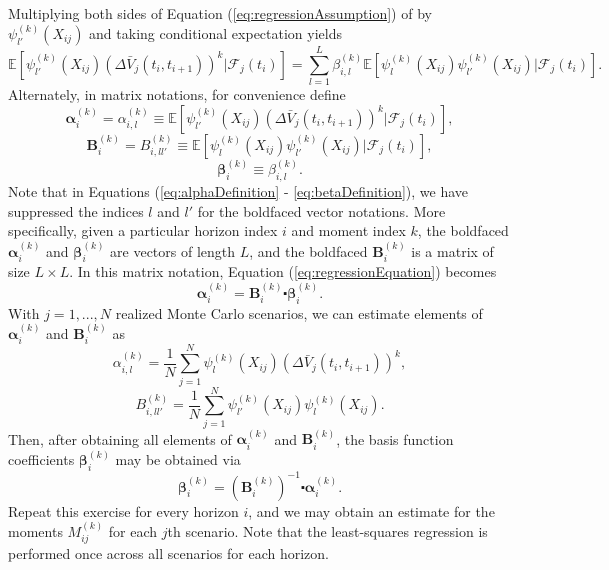 \documentclass[preprint,12pt]{elsarticle}
\begin{document}
Multiplying both sides of Equation (\ref{eq:regressionAssumption}) of by $\psi_{l'}^{(k)}(X_{ij})$ and taking conditional expectation yields
\begin{equation}\label{eq:regressionEquation}
\mathbb{E}\left[\psi_{l'}^{(k)}(X_{ij})\left(\Delta\bar{V}_{j}(t_{i},t_{i+1})\right)^{k}|\mathcal{F}_{j}(t_{i})\right]=\sum_{l=1}^{L}\beta_{i,l}^{(k)}\mathbb{E}\left[\psi_{l}^{(k)}(X_{ij})\psi_{l'}^{(k)}(X_{ij})|\mathcal{F}_{j}(t_{i})\right].
\end{equation}
 Alternately, in matrix notations, for convenience define
\begin{equation}\label{eq:alphaDefinition}
\boldsymbol{\alpha}_{i}^{(k)}=\alpha_{i,l}^{(k)}\equiv\mathbb{E}\left[\psi_{l'}^{(k)}(X_{ij})\left(\Delta\bar{V}_{j}(t_{i},t_{i+1})\right)^{k}|\mathcal{F}_{j}(t_{i})\right],
\end{equation}
\begin{equation}\label{eq:BDefinition}
\boldsymbol{B}_{i}^{(k)}=B_{i,ll'}^{(k)}\equiv\mathbb{E}\left[\psi_{l}^{(k)}(X_{ij})\psi_{l'}^{(k)}(X_{ij})|\mathcal{F}_{j}(t_{i})\right],
\end{equation} 
\begin{equation}\label{eq:betaDefinition}
\boldsymbol{\beta}_{i}^{(k)}\equiv\beta_{i,l}^{(k)}.
\end{equation} 
Note that in Equations (\ref{eq:alphaDefinition} - \ref{eq:betaDefinition}), we have suppressed the indices $l$ and $l'$ for the boldfaced vector notations. More specifically, given a particular horizon index $i$ and moment index $k$, the boldfaced $\boldsymbol{\alpha}_{i}^{(k)}$ and $\boldsymbol{\beta}_{i}^{(k)}$ are vectors of length $L$, and the boldfaced $\boldsymbol{B}_{i}^{(k)}$ is a matrix of size $L\times L$. In this matrix notation, Equation (\ref{eq:regressionEquation}) becomes
\begin{equation}
\boldsymbol{\alpha}_{i}^{(k)}=\boldsymbol{B}_{i}^{(k)}\centerdot\boldsymbol{\beta}_{i}^{(k)}.
\end{equation}
With $j=1,...,N$ realized Monte Carlo scenarios, we can estimate elements of $\boldsymbol{\alpha}_{i}^{(k)}$ and $\boldsymbol{B}_{i}^{(k)}$ as
\begin{equation}\label{eq:RegressionInnerProduct}
\alpha_{i,l}^{(k)}=\frac{1}{N}\sum_{j=1}^{N}\psi_{l}^{(k)}(X_{ij})\left(\Delta\bar{V}_{j}(t_{i},t_{i+1})\right)^{k},
\end{equation}
\begin{equation} \label{eq:RegressionBasisNormMatrix}
B_{i,ll'}^{(k)}=\frac{1}{N}\sum_{j=1}^{N}\psi_{l'}^{(k)}(X_{ij})\psi_{l}^{(k)}(X_{ij}).
\end{equation}
Then, after obtaining all elements of $\boldsymbol{\alpha}_{i}^{(k)}$ and $\boldsymbol{B}_{i}^{(k)}$, the basis function coefficients $\boldsymbol{\beta}_{i}^{(k)}$ may be obtained via
\begin{equation}
\boldsymbol{\beta}_{i}^{(k)}=\left(\boldsymbol{B}_{i}^{(k)}\right)^{-1}\centerdot\boldsymbol{\alpha}_{i}^{(k)}.
\end{equation}
Repeat this exercise for every horizon $i$, and we may obtain an estimate for the moments $M_{ij}^{(k)}$ for each $j$th scenario. Note that the least-squares regression is performed once across all scenarios for each horizon.
 
\end{document}
